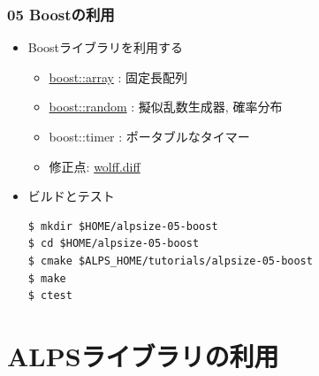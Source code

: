 \begin{frame}[fragile]
  \frametitle{05 Boostの利用}
  \begin{itemize}
    \item Boostライブラリを利用する
      \begin{itemize}
        \item \href{http://boost.org/doc/html/array.html}{boost::array} : 固定長配列
        \item \href{http://boost.org/doc/html/boost_random.html}{boost::random} : 擬似乱数生成器, 確率分布
        \item boost::timer : ポータブルなタイマー
        \item 修正点: \href{https://github.com/cmsi/alps-tutorial/blob/develop/alpsize/05-wolff.diff}{wolff.diff}
      \end{itemize}
    \item ビルドとテスト
\begin{lstlisting}
$ mkdir $HOME/alpsize-05-boost
$ cd $HOME/alpsize-05-boost
$ cmake $ALPS_HOME/tutorials/alpsize-05-boost
$ make
$ ctest
\end{lstlisting}
  \end{itemize}
\end{frame}


\section{ALPSライブラリの利用}
\subsection*{\redm\whitem\greenb}


